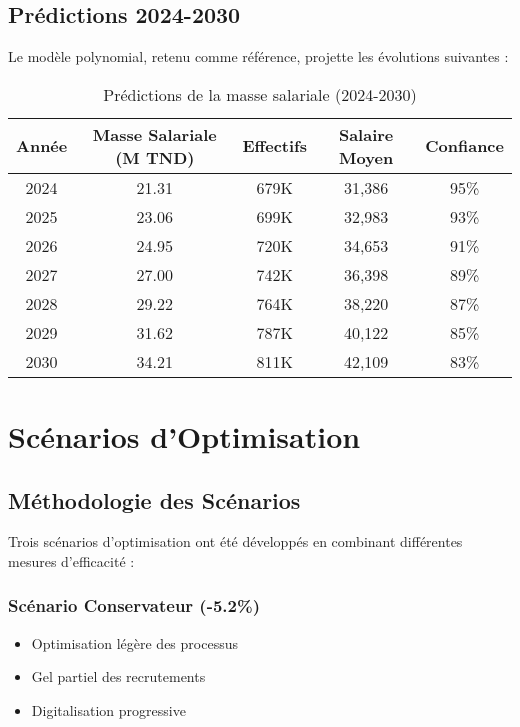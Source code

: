 \documentclass[12pt,a4paper]{article}
\begin{document}
\subsection{Prédictions 2024-2030}
Le modèle polynomial, retenu comme référence, projette les évolutions suivantes :

\begin{table}[H]
\centering
\caption{Prédictions de la masse salariale (2024-2030)}
\begin{tabular}{@{}ccccc@{}}
\toprule
\textbf{Année} & \textbf{Masse Salariale (M TND)} & \textbf{Effectifs} & \textbf{Salaire Moyen} & \textbf{Confiance} \\
\midrule
2024 & 21.31 & 679K & 31,386 & 95\% \\
2025 & 23.06 & 699K & 32,983 & 93\% \\
2026 & 24.95 & 720K & 34,653 & 91\% \\
2027 & 27.00 & 742K & 36,398 & 89\% \\
2028 & 29.22 & 764K & 38,220 & 87\% \\
2029 & 31.62 & 787K & 40,122 & 85\% \\
2030 & 34.21 & 811K & 42,109 & 83\% \\
\bottomrule
\end{tabular}
\end{table}

\newpage

\section{Scénarios d'Optimisation}

\subsection{Méthodologie des Scénarios}
Trois scénarios d'optimisation ont été développés en combinant différentes mesures d'efficacité :

\subsubsection{Scénario Conservateur (-5.2\%)}
\begin{itemize}
    \item Optimisation légère des processus
    \item Gel partiel des recrutements
    \item Digitalisation progressive
\end{itemize}
\end{document}
